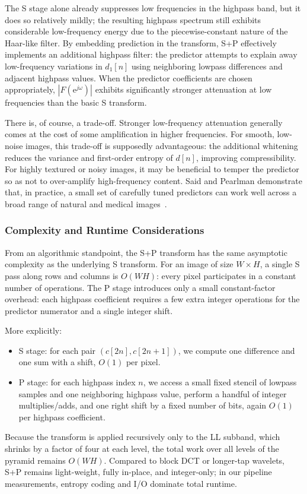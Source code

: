 The S stage alone already suppresses low frequencies in the highpass band, but it does so relatively mildly; the resulting highpass spectrum still exhibits considerable low-frequency energy due to the piecewise-constant nature of the Haar-like filter. By embedding prediction in the transform, S+P effectively implements an additional highpass filter: the predictor attempts to explain away low-frequency variations in $d_1[n]$ using neighboring lowpass differences and adjacent highpass values. When the predictor coefficients are chosen appropriately, $|F(\mathrm{e}^{j\omega})|$ exhibits significantly stronger attenuation at low frequencies than the basic S transform.

There is, of course, a trade-off. Stronger low-frequency attenuation generally comes at the cost of some amplification in higher frequencies. For smooth, low-noise images, this trade-off is supposedly advantageous: the additional whitening reduces the variance and first-order entropy of $d[n]$, improving compressibility. For highly textured or noisy images, it may be beneficial to temper the predictor so as not to over-amplify high-frequency content. Said and Pearlman demonstrate that, in practice, a small set of carefully tuned predictors can work well across a broad range of natural and medical images~\cite{said1993sp}. 


\subsubsection{Complexity and Runtime Considerations}

From an algorithmic standpoint, the S+P transform has the same asymptotic complexity as the underlying S transform. For an image of size $W \times H$, a single S pass along rows and columns is $O(WH)$: every pixel participates in a constant number of operations. The P stage introduces only a small constant-factor overhead: each highpass coefficient requires a few extra integer operations for the predictor numerator and a single integer shift.

More explicitly:
\begin{itemize}
    \item S stage: for each pair $(c[2n], c[2n+1])$, we compute one difference and one sum with a shift, $O(1)$ per pixel.
    \item P stage: for each highpass index $n$, we access a small fixed stencil of lowpass samples and one neighboring highpass value, perform a handful of integer multiplies/adds, and one right shift by a fixed number of bits, again $O(1)$ per highpass coefficient.
\end{itemize}
Because the transform is applied recursively only to the LL subband, which shrinks by a factor of four at each level, the total work over all levels of the pyramid remains $O(WH)$. Compared to block DCT or longer-tap wavelets, S+P remains light-weight, fully in-place, and integer-only; in our pipeline measurements, entropy coding and I/O dominate total runtime.

